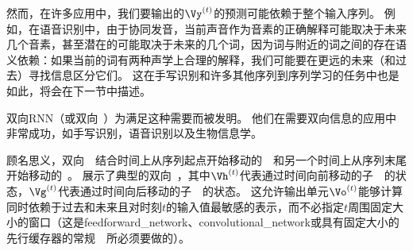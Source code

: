 然而，在许多应用中，我们要输出的$\Vy^{(t)}$的预测可能依赖于整个输入序列。
例如，在语音识别中，由于协同发音，当前声音作为音素的正确解释可能取决于未来几个音素，甚至潜在的可能取决于未来的几个词，因为词与附近的词之间的存在语义依赖：如果当前的词有两种声学上合理的解释，我们可能要在更远的未来（和过去）寻找信息区分它们。
这在手写识别和许多其他序列到序列学习的任务中也是如此，将会在下一节中描述。

双向\gls{RNN}（或双向~）为满足这种需要而被发明\citep{Schuster-Paliwal-1997}。
他们在需要双向信息的应用中非常成功\citep{Graves-2012}，如手写识别\citep{Graves-et-al-2008,Graves-Schmidhuber-2009}，语音识别\citep{Graves-Schmidhuber-2005,Graves-et-al-2013}以及生物信息学\citep{Baldi-et-al-1999}。

顾名思义，双向~~结合时间上从序列起点开始移动的~~和另一个时间上从序列末尾开始移动的~。
展示了典型的双向~，其中$\Vh^{(t)}$代表通过时间向前移动的子~~的状态，$\Vg^{(t)}$代表通过时间向后移动的子~~的状态。
这允许输出单元$\Vo^{(t)}$能够计算同时依赖于过去和未来且对时刻$t$的输入值最敏感的表示，而不必指定$t$周围固定大小的窗口（这是\gls{feedforward_network}、\gls{convolutional_network}或具有固定大小的先行缓存器的常规~~所必须要做的）。


